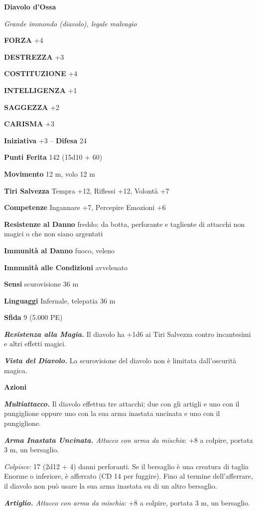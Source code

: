\begin{multicols}{2}
\medskip{}\textbf{Diavolo d'Ossa}

\emph{Grande immondo (diavolo), legale malvagio}

\textbf{FORZA} +4

\textbf{DESTREZZA} +3

\textbf{COSTITUZIONE} +4

\textbf{INTELLIGENZA} +1

\textbf{SAGGEZZA} +2

\textbf{CARISMA} +3

\textbf{Iniziativa} +3 -- \textbf{Difesa} 24

\textbf{Punti Ferita} 142 (15d10 + 60)

\textbf{Movimento} 12 m, volo 12 m

\textbf{Tiri Salvezza} Tempra +12, Riflessi +12, Volontà +7

\textbf{Competenze} Ingannare +7, Percepire Emozioni +6

\textbf{Resistenze al Danno} freddo; da botta, perforante e tagliente di attacchi non magici o che non siano argentati

\textbf{Immunità al Danno} fuoco, veleno

\textbf{Immunità alle Condizioni} avvelenato

\textbf{Sensi} scurovisione 36 m

\textbf{Linguaggi} Infernale, telepatia 36 m 

\textbf{Sfida} 9 (5.000 PE)

\emph{\textbf{Resistenza alla Magia.}} Il diavolo ha +1d6 ai Tiri Salvezza contro incantesimi e altri effetti magici.

\emph{\textbf{Vista del Diavolo.}} La scurovisione del diavolo non è limitata dall'oscurità magica.

\textbf{Azioni}

\emph{\textbf{Multiattacco.}} Il diavolo effettua tre attacchi: due con gli artigli e uno con il pungiglione oppure uno con la sua arma inastata uncinata e uno con il pungiglione.

\emph{\textbf{Arma Inastata Uncinata.} Attacco con arma da mischia}: +8
a colpire, portata 3 m, un bersaglio.

\emph{Colpisce:} 17 (2d12 + 4) danni perforanti. Se il bersaglio è una creatura di taglia Enorme o inferiore, è afferrato (CD 14 per fuggire). Fino al termine dell'afferrare, il diavolo non può usare la sua arma inastata su di un altro bersaglio.

\emph{\textbf{Artiglio.} Attacco con arma da mischia}: +8 a colpire, portata 3 m, un bersaglio.


\end{multicols}
